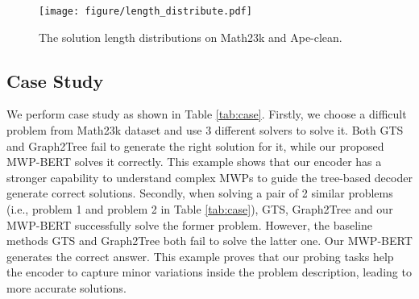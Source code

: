 \documentclass[11pt]{article}
\begin{document}
\begin{figure}[t!]
\centering 
\texttt{[image: figure/length\_distribute.pdf]}
\caption{The solution length distributions on Math23k and Ape-clean.}
\label{fig:length} 
\end{figure}

\subsection{Case Study}
We perform case study as shown in Table \ref{tab:case}. Firstly, we choose a difficult problem from Math23k dataset and use 3 different solvers to solve it. Both GTS \cite{xie2019goal} and Graph2Tree \cite{zhang2020graph} fail to generate the right solution for it, while our proposed MWP-BERT solves it correctly. This example shows that our encoder has a stronger capability to understand complex MWPs to guide the tree-based decoder generate correct solutions. Secondly, when solving  a   pair of 2 similar problems (i.e., problem 1 and problem 2 in Table \ref{tab:case}),   GTS, Graph2Tree and our MWP-BERT successfully solve the former problem. However, the baseline methods GTS and Graph2Tree both fail to solve the latter one.  Our MWP-BERT generates the correct answer. This example proves that our probing tasks help the encoder to capture minor variations inside the problem description, leading to more accurate solutions.


\begin{table}
\renewcommand\arraystretch{1}
\centering
{}
\caption{The answer accuracy of BERT and MWP-BERT on problems with different  lengths in Math23k.  \#op  denotes the number of operators in the solution. \#P is the number of problems of that kind of MWPs in the public test set of Math23k.}
\label{tab:data_length}
\end{table}
\end{document}

